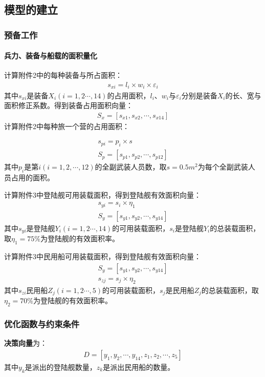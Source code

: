 \documentclass{whutmod}
\begin{document}
	    \subsection{模型的建立}
	    \subsubsection{预备工作}
	    \paragraph{兵力、装备与船载的面积量化}
	    计算附件2中的每种装备与所占面积：
	    \begin{gather*}
	    s_{xi}=l_{i}\times w_{i} \times \varepsilon _{i}
	    \end{gather*}
	    其中$s_{xi}$是装备$X_{i}(i=1,2\cdots,14)$的占用面积，$l_{i}$、$w_{i}$与$\varepsilon _{i}$分别是装备$X_{i}$的长、宽与面积修正系数。得到装备占用面积向量：
	     \begin{gather}
	     S_{x}=[s_{x1},s_{x2},\cdots,s_{x14}]
	     \end{gather}
	     计算附件2中每种旅一个营的占用面积：
	   
	     \begin{gather}
	     s_{pi}=p_{i}\times s\\
	     S_{p}=[s_{p1},s_{p2},\cdots,s_{p12}]
	     \end{gather}
	     其中$p_{i}$是第$i(i=1,2,\cdots,12)$的全副武装人员数，取$s=0.5m^2$为每个全副武装人员占用的面积。
	     
	     计算附件3中登陆舰可用装载面积，得到登陆舰有效面积向量：
	      \begin{gather}
	      s_{yi}=s_{i}\times \eta_{1}\\
	      S_{y}=[s_{y1},s_{y2},\cdots,s_{y14}]
	      \end{gather}
	    其中$s_{yi}$是登陆舰$Y_{i}(i=1,2\cdots,14)$的可用装载面积，$s_{i}$是登陆舰$Y_{i}$的总装载面积，取$\eta_{1}=75\%$为登陆舰的有效面积率。
	    
	    计算附件3中民用船可用装载面积，得到登陆舰有效面积向量：
	      \begin{gather}
	     S_{y}=[s_{y1},s_{y2},\cdots,s_{y14}]\\
	      s_{zj}=s_{j}\times \eta_{2}
	      \end{gather}
	       其中$s_{zi}$民用船$Z_{j}(i=1,2\cdots,5)$的可用装载面积，$s_{j}$是民用船$Z_{j}$的总装载面积，取$\eta_{2}=70\%$为登陆舰的有效面积率。
	    \subsubsection{优化函数与约束条件}
	    \textbf{决策向量}为：
	     \begin{gather}
	     D=[y_{1},y_{2},\cdots,y_{14},z_{1},z_{2},\cdots,z_{5}]
	    \end{gather}
	    其中$y_{k}$是派出的登陆舰数量，$z_{k}$是派出民用船的数量。
	    
\end{document}
